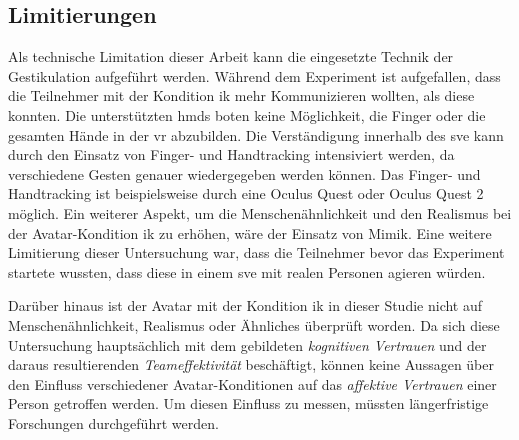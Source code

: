 \documentclass[a4paper,11pt]{article}%
\renewcommand{\\}{\vspace*{0.5\baselineskip} \newline}
\begin{document}
{{%
%			



\subsection{Limitierungen}
Als technische Limitation dieser Arbeit kann die eingesetzte Technik der Gestikulation aufgeführt werden. Während dem Experiment ist aufgefallen, dass die Teilnehmer mit der Kondition \ac{ik} mehr Kommunizieren wollten, als diese konnten. Die unterstützten \ac{hmd}s boten keine Möglichkeit, die Finger oder die gesamten Hände in der \ac{vr} abzubilden. Die Verständigung innerhalb des \ac{sve} kann durch den Einsatz von Finger- und Handtracking intensiviert werden, da verschiedene Gesten genauer wiedergegeben werden können. Das Finger- und Handtracking ist beispielsweise durch eine Oculus Quest oder Oculus Quest 2 möglich. Ein weiterer Aspekt, um die Menschenähnlichkeit und den Realismus bei der Avatar-Kondition \ac{ik} zu erhöhen, wäre der Einsatz von Mimik.
Eine weitere Limitierung dieser Untersuchung war, dass die Teilnehmer bevor das Experiment startete wussten, dass diese in einem \ac{sve} mit realen Personen agieren würden. 

Darüber hinaus ist der Avatar mit der Kondition \ac{ik} in dieser Studie nicht auf Menschenähnlichkeit, Realismus oder Ähnliches überprüft worden. 
Da sich diese Untersuchung hauptsächlich mit dem gebildeten \textit{kognitiven Vertrauen} und der daraus resultierenden \textit{Teameffektivität} beschäftigt, können keine Aussagen über den Einfluss verschiedener Avatar-Konditionen auf das \textit{affektive Vertrauen} einer Person getroffen werden. Um diesen Einfluss zu messen, müssten längerfristige Forschungen durchgeführt werden.


%

}}
\end{document}
